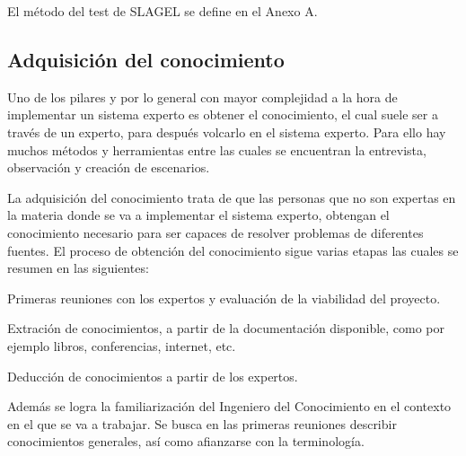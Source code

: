 El método del test de SLAGEL se define en el Anexo A.


\subsection{Adquisición del conocimiento}


Uno de los pilares y por lo general con mayor complejidad a la hora de implementar
 un sistema experto es obtener el conocimiento, el cual suele ser a través de un experto,
 para después volcarlo en el sistema experto. Para ello hay muchos métodos y herramientas
 entre las cuales se encuentran la entrevista, observación y creación de escenarios.


La adquisición del conocimiento trata de que las personas que no son expertas en la materia
 donde se va a implementar el sistema experto, obtengan el conocimiento necesario para ser
 capaces de resolver problemas de diferentes fuentes. El proceso de obtención del conocimiento
 sigue varias etapas las cuales se resumen en las siguientes:

\begin{compactitem}
  \item Primeras reuniones con los expertos y evaluación de la viabilidad del proyecto.
  \item Extración de conocimientos, a partir de la documentación disponible, como
     por ejemplo libros, conferencias, internet, etc.
  \item Deducción de conocimientos a partir de los expertos.
\end{compactitem}

Además se logra la familiarización del Ingeniero del Conocimiento en el contexto en
 el que se va a trabajar. Se busca en las primeras reuniones describir conocimientos
 generales, así como afianzarse con la terminología.

